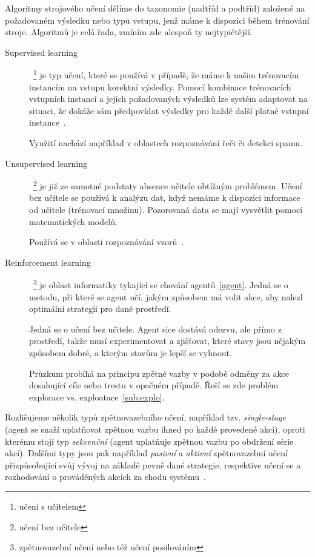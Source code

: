 \documentclass[thesis=M,czech]{FITthesis}[2014/05/07]
\begin{document}
Algoritmy strojového učení dělíme do taxonomie (nadtříd a podtříd) založené na požadovaném výsledku nebo typu vstupu, jenž máme k dispozici během trénování stroje. Algoritmů je celá řada, zmíním zde alespoň ty nejtypičtější. 

\begin{description}
  \item[Supervised learning]~\footnote{učení s učitelem} je typ učení, které se používá v případě, že máme k našim trénovacím instancím na vstupu korektní výsledky. Pomocí kombinace trénovacích vstupních instancí a jejich požadovaných výsledků lze systém adaptovat na situaci, že dokáže sám předpovídat výsledky pro každé další platné vstupní instance~\cite{aihorizon}.
  
  Využití nachází například v oblastech rozpoznávání řeči či detekci spamu.
  \item[Unsupervised learning]~\footnote{učení bez učitele} je již ze samotné podstaty absence učitele obtížným problémem. Učení bez učitele se používá k analýzu dat, když nemáme k dispozici informace od učitele (trénovací množinu). Pozorovaná data se mají vysvětlit pomocí matematických modelů.
  
  Používá se v oblasti rozpoznávání vzorů~\cite{hlavac}.
  \item[Reinforcement learning]~\footnote{zpětnovazební učení nebo též učení posilováním} je oblast informatiky tykající se chování agentů~\ref{agent}. Jedná se o metodu, při které se agent učí, jakým způsobem má volit akce, aby nalezl optimální strategii pro dané prostředí.
  
  Jedná se o učení bez učitele. Agent sice dostává odezvu, ale přímo z prostředí, takže musí experimentovat a zjišťovat, které stavy jsou nějakým způsobem dobré, a kterým stavům je lepší se vyhnout.
  
  Průzkum probíhá na principu zpětné vazby v podobě odměny za akce dosahující cíle nebo trestu v opačném případě. Řeší se zde problém explorace vs. exploatace~\ref{sub:explo}. 
\end{description}

Rozlišujeme několik typů zpětnovazebního učení, například tzv. \emph{single-stage} (agent se snaží uplatňovat zpětnou vazbu ihned po každé provedené akci), oproti kterému stojí typ \emph{sekvenční} (agent uplatňuje zpětnou vazbu po obdržení série akcí). Dalšími typy jsou pak například \emph{pasivní} a \emph{aktivní} zpětnovazební učení přizpůsobující svůj vývoj na základě pevně dané strategie, respektive učení se a rozhodování o prováděných akcích za chodu systému~\cite{reinforcement}.
\end{document}
